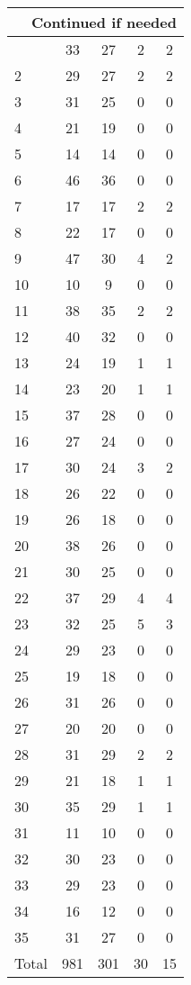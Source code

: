 \begin{center}
\begin{longtable}{l|c|c|c|c}
\hline \multicolumn{5}{|r|}{{Continued if needed}} \\ \hline
\endfoot 
1 & 33 & 27 & 2 & 2\\ \hline
2 & 29 & 27 & 2 & 2\\ \hline
3 & 31 & 25 & 0 & 0\\ \hline
4 & 21 & 19 & 0 & 0\\ \hline
5 & 14 & 14 & 0 & 0\\ \hline
6 & 46 & 36 & 0 & 0\\ \hline
7 & 17 & 17 & 2 & 2\\ \hline
8 & 22 & 17 & 0 & 0\\ \hline
9 & 47 & 30 & 4 & 2\\ \hline
10 & 10 & 9 & 0 & 0\\ \hline
11 & 38 & 35 & 2 & 2\\ \hline
12 & 40 & 32 & 0 & 0\\ \hline
13 & 24 & 19 & 1 & 1\\ \hline
14 & 23 & 20 & 1 & 1\\ \hline
15 & 37 & 28 & 0 & 0\\ \hline
16 & 27 & 24 & 0 & 0\\ \hline
17 & 30 & 24 & 3 & 2\\ \hline
18 & 26 & 22 & 0 & 0\\ \hline
19 & 26 & 18 & 0 & 0\\ \hline
20 & 38 & 26 & 0 & 0\\ \hline
21 & 30 & 25 & 0 & 0\\ \hline
22 & 37 & 29 & 4 & 4\\ \hline
23 & 32 & 25 & 5 & 3\\ \hline
24 & 29 & 23 & 0 & 0\\ \hline
25 & 19 & 18 & 0 & 0\\ \hline
26 & 31 & 26 & 0 & 0\\ \hline
27 & 20 & 20 & 0 & 0\\ \hline
28 & 31 & 29 & 2 & 2\\ \hline
29 & 21 & 18 & 1 & 1\\ \hline
30 & 35 & 29 & 1 & 1\\ \hline
31 & 11 & 10 & 0 & 0\\ \hline
32 & 30 & 23 & 0 & 0\\ \hline
33 & 29 & 23 & 0 & 0\\ \hline
34 & 16 & 12 & 0 & 0\\ \hline
35 & 31 & 27 & 0 & 0\\ \hline
\hline \hline
Total & 981 & 301 & 30 & 15



\end{longtable}
\end{center}

